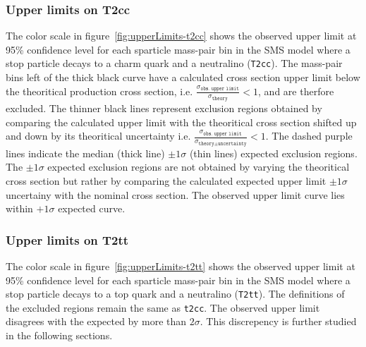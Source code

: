 \subsubsection{Upper limits on T2cc}
The color scale in figure~\ref{fig:upperLimits-t2cc} shows the observed upper 
limit at 95\% confidence level for each sparticle mass-pair bin in the SMS 
model where a stop particle decays to a charm quark and a neutralino (\texttt{T2cc}). 
The mass-pair bins left of the thick black curve have a calculated cross 
section upper limit below the theoritical production cross section, 
i.e. $\frac{\sigma_{\texttt{obs. upper limit}}}{\sigma_{\texttt{theory}}} < 1$, and
are therfore excluded. The thinner black lines represent exclusion regions obtained by
comparing the calculated upper limit with the theoritical cross section shifted up and 
down by its theoritical uncertainty i.e. 
$\frac{\sigma_{\texttt{obs. upper limit}}}{\sigma_{\texttt{theory} \pm \texttt{uncertainty}}} < 1$.
The dashed purple lines indicate the median (thick line) $\pm 1 \sigma$ 
(thin lines) expected exclusion regions. The $\pm 1 \sigma$ expected exclusion 
regions are not obtained by varying the theoritical cross section but rather 
by comparing the calculated expected upper limit $\pm 1 \sigma$ uncertainy
with the nominal cross section. The observed upper limit curve lies within
$+1 \sigma$ expected curve.  

\subsubsection{Upper limits on T2tt}

The color scale in figure~\ref{fig:upperLimits-t2tt} shows the observed upper 
limit at 95\% confidence level for each sparticle mass-pair bin in the SMS 
model where a stop particle decays to a top quark and a neutralino (\texttt{T2tt}). 
The definitions of the excluded regions remain the same as \texttt{t2cc}.
The observed upper limit disagrees with the expected by more than $2 \sigma$.
This discrepency is further studied in the following sections. 

